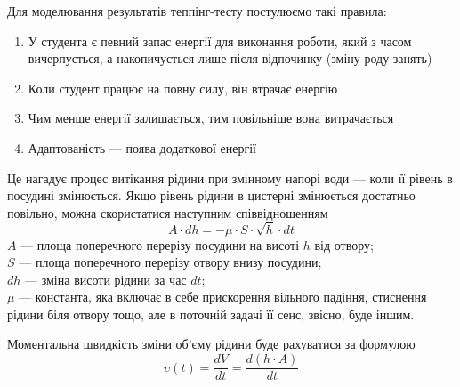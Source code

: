 Для моделювання результатів теппінг-тесту постулюємо такі правила:
\begin{enumerate}
  \item У студента є певний запас енергії для виконання роботи, який з часом
    вичерпується, а накопичується лише після відпочинку (зміну роду занять)
  \item Коли студент працює на повну силу, він втрачає енергію
  \item Чим менше енергії залишається, тим повільніше вона витрачається
  \item Адаптованість --- поява додаткової енергії
\end{enumerate}

Це нагадує процес витікання рідини при змінному напорі води --- коли її рівень
в посудині змінюється.
Якщо рівень рідини в цистерні змінюється достатньо повільно, можна скористатися
наступним співвідношенням \cite{Sheypak:2007}
\begin{equation}\label{eq:hydraulics}
  A \cdot dh = - \mu \cdot S \cdot \sqrt{h} \cdot dt
\end{equation}
$A$ --- площа поперечного перерізу посудини на висоті $h$ від отвору;\\
$S$ --- площа поперечного перерізу отвору внизу посудини;\\
$dh$ --- зміна висоти рідини за час $dt$;\\
$\mu$ --- константа, яка включає в себе прискорення вільного падіння,
стиснення рідини біля отвору тощо, але в поточній задачі її сенс, звісно,
буде іншим.

Моментальна швидкість зміни об’єму рідини буде рахуватися за формулою
\begin{equation}\label{eq:hydrodynamics:volumeChange}
  \upsilon\left( t \right)
  = \frac{dV}{dt} = \frac{d\left( h \cdot A \right)}{dt}
\end{equation}

